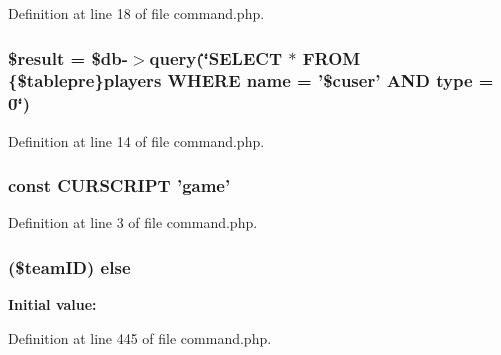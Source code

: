 Definition at line 18 of file command.\+php.

\hypertarget{command_8php_a112ef069ddc0454086e3d1e6d8d55d07}{
\subsubsection[{\$result}]{\setlength{\rightskip}{0pt plus 5cm}\${\bf result} = \$db-\/$>$query(\char`\"{}S\+E\+L\+E\+C\+T $\ast$ F\+R\+O\+M \{\$tablepre\}players W\+H\+E\+R\+E name = '\$cuser' A\+N\+D type = 0\char`\"{})}}\label{command_8php_a112ef069ddc0454086e3d1e6d8d55d07}


Definition at line 14 of file command.\+php.

\hypertarget{command_8php_a39c39f525eceb86cabc338804f230e80}{
\subsubsection[{C\+U\+R\+S\+C\+R\+I\+P\+T}]{\setlength{\rightskip}{0pt plus 5cm}const C\+U\+R\+S\+C\+R\+I\+P\+T 'game'}}\label{command_8php_a39c39f525eceb86cabc338804f230e80}


Definition at line 3 of file command.\+php.

\hypertarget{command_8php_a3b5760e545e497c5b3121939c8315e0e}{
\subsubsection[{else}]{ (\$team\+I\+D) else}}\label{command_8php_a3b5760e545e497c5b3121939c8315e0e}
{\bfseries Initial value\+:}


Definition at line 445 of file command.\+php.

